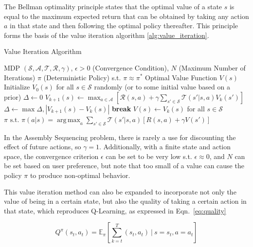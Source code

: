 \documentclass{article}
\DeclareMathOperator*{\argmax}{arg\,max}
\begin{document}
The Bellman optimality principle states that the optimal value of a state $s$ is equal to the maximum expected return that can be obtained by taking any action $a$ in that state and then following the optimal policy thereafter. This principle forms the basis of the value iteration algorithm \ref{alg:value_iteration}.
\begin{algorithm}[H]
    \caption{Value Iteration Algorithm}
    \label{alg:value_iteration}
    \begin{algorithmic}[1]
        \Require MDP $(\mathcal{S}, \mathcal{A}, \mathcal{T}, \mathcal{R}, \gamma)$, 
        \Require $\epsilon > 0$  (Convergence Condition), $N$ (Maximum Number of Iterations)
        \Ensure $\pi$ (Deterministic Policy) s.t. $\pi \approx \pi^*$
        \Ensure Optimal Value Function $V(s)$
        \State Initialize $V_0(s)$ for all $s \in \mathcal{S}$ randomly (or to some initial value based on a prior)
        \State $\Delta \gets 0$
        \State $V_{k+1}(s) \gets \max_{a \in \mathcal{A}} \left [ \mathcal{R}(s,a) + \gamma \sum_{s' \in \mathcal{S}} \mathcal{T}(s' | s,a) V_k(s') \right ]$
        \State $\Delta \gets \max {\Delta, |V_{k+1}(s) - V_k(s)|}$
        \EndFor
        \If{$\Delta < \epsilon$}
        \State \textbf{break}
        \EndIf
        \EndFor
        \State $V(s) \gets V_k(s)$ for all $s \in \mathcal{S}$
        \State \Return $\pi \text { s.t. } \pi(a|s)=\argmax_{a} \sum_{s'\in\mathcal{S}} \mathcal{T}(s'|s,a)\left[R(s,a)+\gamma V(s')\right]$
    \end{algorithmic}
\end{algorithm}

In the Assembly Sequencing problem, there is rarely a use for discounting the effect of future actions, so $\gamma = 1$. Additionally, with a finite state and action space, the convergence criterion $\epsilon$ can be set to be very low s.t. $\epsilon \approx 0$, and $N$ can be set based on user preference, but note that too small of a value can cause the policy $\pi$ to produce non-optimal behavior.

This value iteration method can also be expanded to incorporate not only the value of being in a certain state, but also the quality of taking a certain action in that state, which reproduces Q-Learning, as expressed in Eqn.~\ref{eq:quality}

\begin{equation}\label{eq:quality}
    Q^\pi\left(s_t, a_t\right)=\mathbb{E}_\pi\left[\sum_{k=t}^T \left(s_t, a_t\right)\ \bigg|\ s=s_t, a=a_t\right]
\end{equation}
\end{document}
